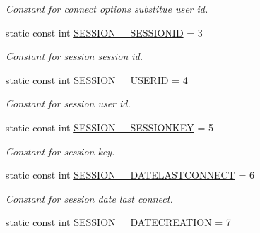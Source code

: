 \begin{DoxyCompactItemize}
\begin{DoxyCompactList}\small\item\em Constant for connect options substitue user id. \item\end{DoxyCompactList}\item 
\hypertarget{classUMS__Data_1_1UMS__DataPackage_a24ba73dd132b47c577aff0684e79b786}{
static const int \hyperlink{classUMS__Data_1_1UMS__DataPackage_a24ba73dd132b47c577aff0684e79b786}{SESSION\_\-\_\-SESSIONID} = 3}
\label{classUMS__Data_1_1UMS__DataPackage_a24ba73dd132b47c577aff0684e79b786}

\begin{DoxyCompactList}\small\item\em Constant for session session id. \item\end{DoxyCompactList}\item 
\hypertarget{classUMS__Data_1_1UMS__DataPackage_a60613025f7784451c379dbeb964099aa}{
static const int \hyperlink{classUMS__Data_1_1UMS__DataPackage_a60613025f7784451c379dbeb964099aa}{SESSION\_\-\_\-USERID} = 4}
\label{classUMS__Data_1_1UMS__DataPackage_a60613025f7784451c379dbeb964099aa}

\begin{DoxyCompactList}\small\item\em Constant for session user id. \item\end{DoxyCompactList}\item 
\hypertarget{classUMS__Data_1_1UMS__DataPackage_a61b4ed0664ba137be883b88543ae0c79}{
static const int \hyperlink{classUMS__Data_1_1UMS__DataPackage_a61b4ed0664ba137be883b88543ae0c79}{SESSION\_\-\_\-SESSIONKEY} = 5}
\label{classUMS__Data_1_1UMS__DataPackage_a61b4ed0664ba137be883b88543ae0c79}

\begin{DoxyCompactList}\small\item\em Constant for session key. \item\end{DoxyCompactList}\item 
\hypertarget{classUMS__Data_1_1UMS__DataPackage_a054a2dc9382456429205373fed0927f6}{
static const int \hyperlink{classUMS__Data_1_1UMS__DataPackage_a054a2dc9382456429205373fed0927f6}{SESSION\_\-\_\-DATELASTCONNECT} = 6}
\label{classUMS__Data_1_1UMS__DataPackage_a054a2dc9382456429205373fed0927f6}

\begin{DoxyCompactList}\small\item\em Constant for session date last connect. \item\end{DoxyCompactList}\item 
\hypertarget{classUMS__Data_1_1UMS__DataPackage_a2d0a5d877f73213385f9d043c9743651}{
static const int \hyperlink{classUMS__Data_1_1UMS__DataPackage_a2d0a5d877f73213385f9d043c9743651}{SESSION\_\-\_\-DATECREATION} = 7}
\label{classUMS__Data_1_1UMS__DataPackage_a2d0a5d877f73213385f9d043c9743651}


\end{DoxyCompactItemize}
